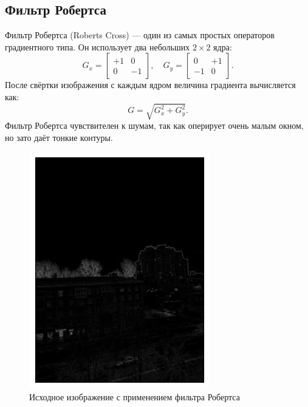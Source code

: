 \documentclass[a4paper,12pt]{article}
\begin{document}
\subsection{Фильтр Робертса}
Фильтр Робертса (Roberts Cross) --- один из самых простых операторов градиентного типа. Он использует два небольших \(2\times 2\) ядра:
\[
G_x = 
\begin{bmatrix}
+1 & 0 \\
0 & -1 
\end{bmatrix},
\quad
G_y =
\begin{bmatrix}
0 & +1 \\
-1 & 0 
\end{bmatrix}.
\]
После свёртки изображения с каждым ядром величина градиента вычисляется как:
\[
G = \sqrt{G_x^2 + G_y^2}.
\]
Фильтр Робертса чувствителен к шумам, так как оперирует очень малым окном, но зато даёт тонкие контуры.
\begin{figure}[H]
    \centering \includegraphics[width=0.7\textwidth]{results/hpf_1.png}
    \caption{Исходное изображение с применением фильтра Робертса}
\end{figure}
\end{document}
